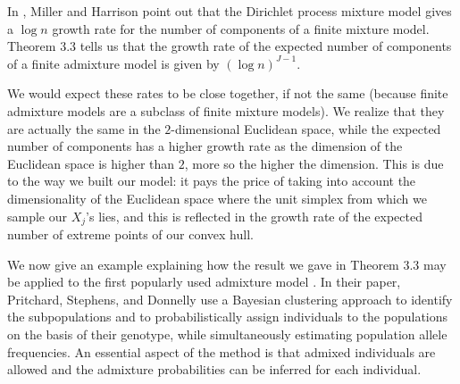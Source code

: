 \documentclass[12pt, reqno]{amsart}
\theoremstyle{definition}
\begin{document}
In \cite[section 7.3.3]{miller}, Miller and Harrison point out that the Dirichlet process mixture model gives a $\log n$ growth rate for the number of components of a finite mixture model. Theorem 3.3 tells us that the growth rate of the {expected} number of components of a finite admixture model is given by $(\log n)^{J-1}$.

We would expect these rates to be close together, if not the same (because finite admixture models are a subclass of finite mixture models). We realize that they are actually the same in the $2$-dimensional Euclidean space, while the {expected} number of components has a higher growth rate as the dimension of the Euclidean space is higher than $2$, more so the higher the dimension. This is due to the way we built our model: it pays the price of taking into account the dimensionality of the Euclidean space where the unit simplex from which we sample our $X_j$'s lies, and this is reflected in the growth rate of the expected number of extreme points of our convex hull.

We now give an example explaining how the result we gave in Theorem 3.3 may be applied to the first popularly used admixture model \cite{Pritchard945}. In their paper, Pritchard, Stephens, and Donnelly use a Bayesian clustering approach to identify the subpopulations and to probabilistically assign individuals to the populations on the basis of their genotype, while simultaneously estimating population allele frequencies. An essential aspect of the method is that admixed individuals are allowed and the admixture probabilities can be inferred for each individual.
\end{document}
